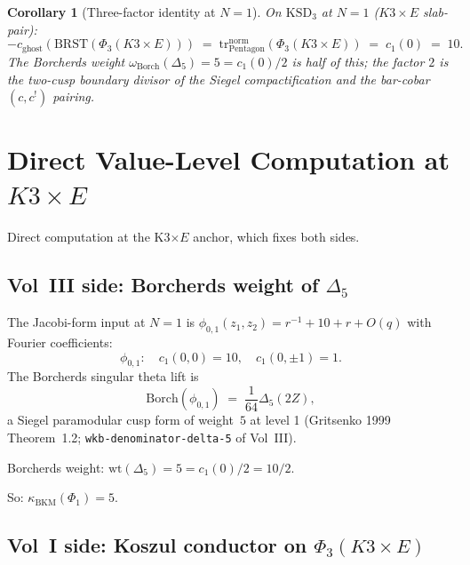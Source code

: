 \documentclass[11pt]{amsart}
\newtheorem{corollary}[theorem]{Corollary}
\theoremstyle{definition}
\theoremstyle{remark}
\newcommand{\kBKM}{\kappa_{\mathrm{BKM}}}
\newcommand{\Borch}{\mathrm{Borch}}
\newcommand{\BRST}{\mathrm{BRST}}
\begin{document}
\begin{corollary}[Three-factor identity at $N = 1$]
On $\mathrm{KSD}_3$ at $N = 1$ ($K3 \times E$ slab-pair):
\[
-c_{\mathrm{ghost}}(\BRST(\Phi_3(K3 \times E))) \;=\; \mathrm{tr}_{\mathrm{Pentagon}}^{\mathrm{norm}}(\Phi_3(K3 \times E)) \;=\; c_1(0) \;=\; 10.
\]
The Borcherds weight $\omega_{\Borch}(\Delta_5) = 5 = c_1(0)/2$ is \emph{half} of this; the factor
$2$ is the two-cusp boundary divisor of the Siegel compactification and the bar-cobar $(c, c^!)$
pairing.
\end{corollary}

\section{Direct Value-Level Computation at $K3 \times E$}

Direct computation at the K3$\times E$ anchor, which fixes both sides.

\subsection{Vol~III side: Borcherds weight of $\Delta_5$}

The Jacobi-form input at $N = 1$ is $\phi_{0,1}(z_1, z_2) = r^{-1} + 10 + r + O(q)$ with Fourier
coefficients:
\[
\phi_{0,1}: \quad c_1(0, 0) = 10, \quad c_1(0, \pm 1) = 1.
\]
The Borcherds singular theta lift is
\[
\Borch(\phi_{0,1}) \;=\; \frac{1}{64} \Delta_5(2Z),
\]
a Siegel paramodular cusp form of weight~$5$ at level 1 (Gritsenko 1999 Theorem~1.2;
\texttt{wkb-denominator-delta-5} of Vol~III).

Borcherds weight: $\mathrm{wt}(\Delta_5) = 5 = c_1(0)/2 = 10/2$.

So: $\kBKM(\Phi_1) = 5$.

\subsection{Vol~I side: Koszul conductor on $\Phi_3(K3 \times E)$}
\end{document}
